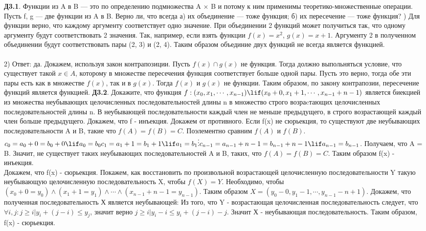 \documentclass[12pt, a4paper]{article}
\begin{document}
	\textbf{Д3.1}. Функции из A в B — это по определению подмножества A × B и потому к ним применимы
	теоретико-множественные операции. Пусть f, g — две функции из A в B. Верно ли, что всегда а) их
	объединение — тоже функция; б) их пересечение — тоже функция?
	) Для функции верно, что каждому аргументу соответствует одно значение. При объединении 2 функций может получиться так, что одному аргументу будут соответствовать 2 значения. Так, например, если взять функции $f(x) = x^2$, $g(x) = x + 1$. Аргументу 2 в полученном объединении будут соответствовать пары (2, 3) и (2, 4). Таким образом объединие двух функций не всегда является функцией.\\
	\\
	2) Ответ: да. Докажем, используя закон контрапозиции. Пусть $f(x) \cap g(x)$ не функция. Тогда должно выпольняться условие, что существует такой $x \in A$, которому в множестве пересечения функция соответствует больше одной пары. Пусть это верно, тогда обе эти пары есть как в множестве $f(x)$, так и в $g(x)$. Тогда $f(x)$ и $g(x)$ не функции. Таким образом, по закону контрапозии, пересечение функций является функцией.
	\bspace
	\textbf{Д3.2}. Докажите, что функция $f: (x_0, x_1, \cdots, x_{n - 1}) \lif (x_0 + 0, x_1 + 1, \cdots, x_{n - 1} + n - 1)$ является биекцией
	из множества неубывающих целочисленных последовательностей длины n в множество строго возраcтающих целочисленных последовательностей длины n. В неубывающей последовательности каждый
	член не меньше предыдущего, в строго возрастающей каждый член больше предыдущего.
	\bspace
	Докажем, что f - инъекция. Докажем от противного. Если f(x) не сюрьекция, то существуют две неубывающих последовательности A и B, такие что $f(A) = f(B) = C$. Поэлементно сравним $f(A)$ и $f(B)$. \\
	$c_0 = a_0 + 0 = b_0 + 0  \lif a_0 = b_0 \\
	c_1 = a_1 + 1 = b_1 + 1 \lif a_1 = b_1 \\
	\vdots \\
	c_{n - 1} = a_{n - 1} + n - 1 = b_{n - 1} + n - 1 \lif a_{n - 1} = b_{n - 1}$. Получаем, что A = B. Значит, не существует таких неубывающих последовательностей A и B, таких, что $f(A) = f(B) = C$. Таким образом f(x) - инъекция. \\
	Докажем, что f(x) - сюрьекция. Покажем, как восстановить по произвольной возрастающей целочисленную последовательности Y такую неубывающую целочисленную последовательность X, чтобы $f(X) = Y$.
	Необходимо, чтобы $(x_0 + 0 = y_0) \land (x_1 + 1 = y_1) \land \cdots \land (x_{n - 1} + n - 1 = y_{n - 1})$. Таким образом $X = (y_0 - 0, y_1 - 1, \cdots, y_{n - 1} - n + 1)$. Докажем, что полученная последовательность Х является неубывающей: Из того, что Y - возрастающая целочисленная последовательность следует, что $\forall i, j : j \geq i | y_i + (j - i) \leq y_j$, значит верно $j \geq i | y_i - i \leq y_i + (j - i) - j $. Значит Х - неубывающая последовательность. Таким образом, f(x) - сюрьекция.\\
\end{document}
